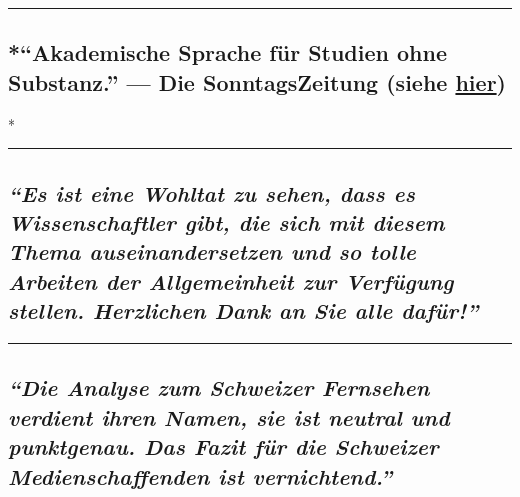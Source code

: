 \begin{center}\rule{0.5\linewidth}{\linethickness}\end{center}

\hypertarget{akademische-sprache-fuxfcr-studien-ohne-substanz--die-sonntagszeitung-siehe-hier}{%
\subsection{\texorpdfstring{*``Akademische Sprache für Studien ohne
Substanz.'' --- Die SonntagsZeitung (siehe
\href{https://swprs.org/medienspiegel/}{hier})}{*``Akademische Sprache für Studien ohne Substanz.'' --- Die SonntagsZeitung (siehe hier)}}\label{akademische-sprache-fuxfcr-studien-ohne-substanz--die-sonntagszeitung-siehe-hier}}

*

\begin{center}\rule{0.5\linewidth}{\linethickness}\end{center}

\hypertarget{es-ist-eine-wohltat-zu-sehen-dass-es-wissenschaftler-gibt-die-sich-mit-diesem-thema-auseinandersetzen-und-so-tolle-arbeiten-der-allgemeinheit-zur-verfuxfcgung-stellen-herzlichen-dank-an-sie-alle-dafuxfcr}{%
\subsection{\texorpdfstring{\emph{``Es ist eine Wohltat zu sehen, dass
es Wissenschaftler gibt, die sich mit diesem Thema auseinandersetzen und
so tolle Arbeiten der Allgemeinheit zur Verfügung stellen. Herzlichen
Dank an Sie alle
dafür!''}}{``Es ist eine Wohltat zu sehen, dass es Wissenschaftler gibt, die sich mit diesem Thema auseinandersetzen und so tolle Arbeiten der Allgemeinheit zur Verfügung stellen. Herzlichen Dank an Sie alle dafür!''}}\label{es-ist-eine-wohltat-zu-sehen-dass-es-wissenschaftler-gibt-die-sich-mit-diesem-thema-auseinandersetzen-und-so-tolle-arbeiten-der-allgemeinheit-zur-verfuxfcgung-stellen-herzlichen-dank-an-sie-alle-dafuxfcr}}

\begin{center}\rule{0.5\linewidth}{\linethickness}\end{center}

\hypertarget{die-analyse-zum-schweizer-fernsehen-verdient-ihren-namen-sie-ist-neutral-und-punktgenau-das-fazit-fuxfcr-die-schweizer-medienschaffenden-ist-vernichtend}{%
\subsection{\texorpdfstring{\emph{``Die Analyse zum Schweizer Fernsehen
verdient ihren Namen, sie ist neutral und punktgenau. Das Fazit für die
Schweizer Medienschaffenden ist
vernichtend.''}}{``Die Analyse zum Schweizer Fernsehen verdient ihren Namen, sie ist neutral und punktgenau. Das Fazit für die Schweizer Medienschaffenden ist vernichtend.''}}\label{die-analyse-zum-schweizer-fernsehen-verdient-ihren-namen-sie-ist-neutral-und-punktgenau-das-fazit-fuxfcr-die-schweizer-medienschaffenden-ist-vernichtend}}

